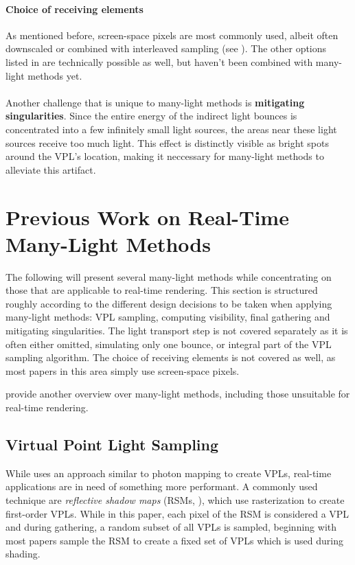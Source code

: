 \paragraph{Choice of receiving elements}
As mentioned before, screen-space pixels are most commonly used, albeit often downscaled or combined with interleaved sampling (see ). The other options listed in  are technically possible as well, but haven't been combined with many-light methods yet.
\\
\\
Another challenge that is unique to many-light methods is \textbf{mitigating singularities}. Since the entire energy of the indirect light bounces is concentrated into a few infinitely small light sources, the areas near these light sources receive too much light. This effect is distinctly visible as bright spots around the VPL's location, making it neccessary for many-light methods to alleviate this artifact.



\section{Previous Work on Real-Time Many-Light Methods}

The following will present several many-light methods while concentrating on those that are applicable to real-time rendering. This section is structured roughly according to the different design decisions to be taken when applying many-light methods: VPL sampling, computing visibility, final gathering and mitigating singularities. The light transport step is not covered separately as it is often either omitted, simulating only one bounce, or integral part of the VPL sampling algorithm. The choice of receiving elements is not covered as well, as most papers in this area simply use screen-space pixels.

\citet{Dachsbacher:2014:ManyLightsSTAR} provide another overview over many-light methods, including those unsuitable for real-time rendering.


\subsection{Virtual Point Light Sampling}

While \citet{Keller:1997:InstantRadiosity} uses an approach similar to photon mapping to create VPLs, real-time applications are in need of something more performant. A commonly used technique are \emph{reflective shadow maps} (RSMs, \cite{Dachsbacher:2005:RSM}), which use rasterization to create first-order VPLs. While in this paper, each pixel of the RSM is considered a VPL and during gathering, a random subset of all VPLs is sampled, beginning with \citet{dachsbacher2006splatting} most papers sample the RSM to create a fixed set of VPLs which is used during shading.

